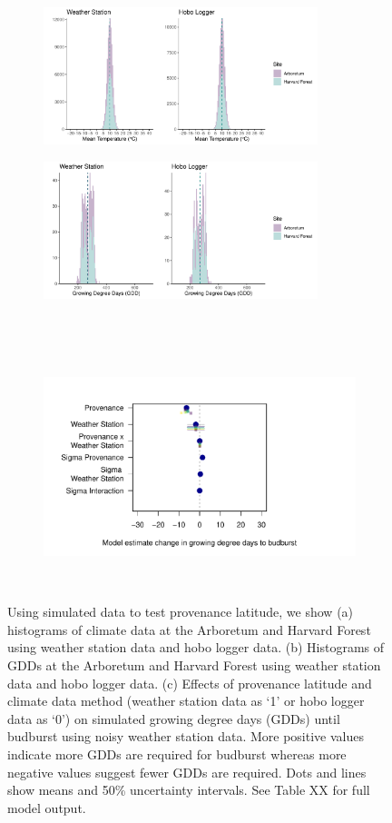 \documentclass{article}\usepackage[]{graphicx}\usepackage[]{color}
\begin{document}
\begin{figure}
  \begin{subfigure}{.5\linewidth}
    \caption{}
    \centering
    \includegraphics[height=4cm, width=8cm]{..//analyses/figures/clim_methods_prov.pdf}
    \label{fig:gddprov}
  \end{subfigure}%
    \begin{subfigure}{.5\linewidth}
      \caption{}
      \centering
      \includegraphics[height=4cm, width=8cm]{..//analyses/figures/gdd_methods_prov.pdf}
    \label{fig:climprov}
  \end{subfigure}\\[1ex]
  \begin{subfigure}{\linewidth}
	    \caption{}
      \centering
      \includegraphics[height=7cm, width=11cm]{..//analyses/figures/muplot_prov.pdf}
      \label{fig:muplotprov}
  \end{subfigure}
\caption{ Using simulated data to test provenance latitude, we show (a) histograms of climate data at the Arboretum and Harvard Forest using weather station data and hobo logger data. (b) Histograms of GDDs at the Arboretum and Harvard Forest using weather station data and hobo logger data. (c) Effects of provenance latitude and climate data method (weather station data as `1' or hobo logger data as `0') on simulated growing degree days (GDDs) until budburst using noisy weather station data. More positive values indicate more GDDs are required for budburst whereas more negative values suggest fewer GDDs are required. Dots and lines show means and 50\% uncertainty intervals. See Table XX for full model output.}

\end{figure}
\end{document}
